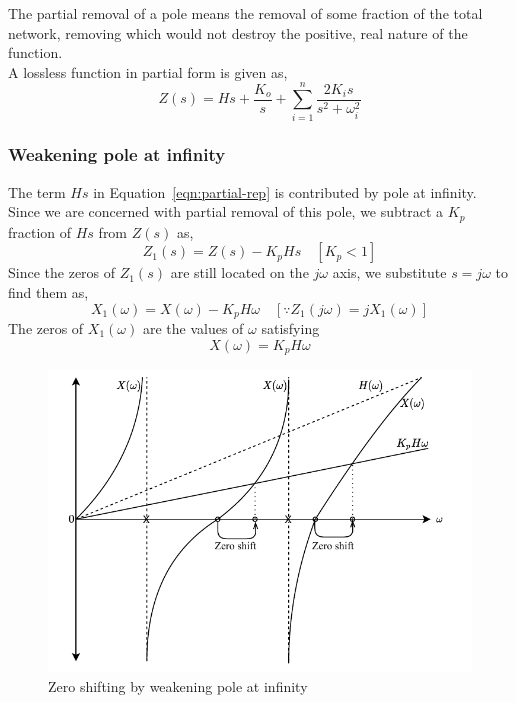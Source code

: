 The partial removal of a pole means the removal of some fraction of the total network, removing which would not destroy the positive, real nature of the function.\\
A lossless function in partial form is given as,
\begin{equation}
    Z(s)=Hs+\frac{K_o}{s}+\sum_{i=1}^{n}\frac{2K_is}{s^2+\omega_i^2}
    \label{eqn:partial-rep}
\end{equation}
\subsubsection*{Weakening pole at infinity}
The term $Hs$ in Equation~\ref{eqn:partial-rep} is contributed by pole at infinity. Since we are concerned with partial removal of this pole, we subtract a $K_p$ fraction of $Hs$ from $Z(s)$ as,
\begin{equation*}
    Z_1(s)=Z(s)-K_pHs \quad [K_p<1]
\end{equation*}
Since the zeros of $Z_1(s)$ are still located on the $j\omega$ axis, we substitute $s=j\omega$ to find them as,
\begin{equation*}
    X_1(\omega)=X(\omega)-K_pH\omega \quad
    [\because Z_1(j\omega)=jX_1(\omega)]
\end{equation*}
The zeros of $X_1(\omega)$ are the values of $\omega$ satisfying
\begin{equation*}
    X(\omega)=K_pH\omega
\end{equation*}
\begin{figure}[H]
    \centering
    \includegraphics{../Figures/zero_shifting_by_weakening_pole_at_inf}
    \caption{Zero shifting by weakening pole at infinity}
    \label{fig:pole-inf}
\end{figure}

